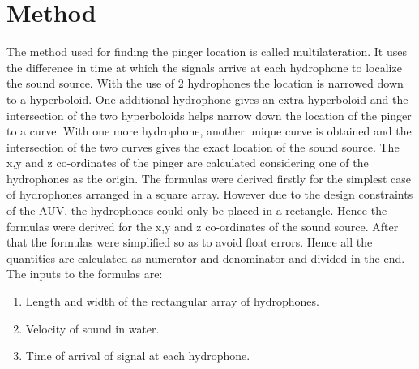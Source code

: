 \section{Method}\label{sec:method}
The method used for finding the pinger location is called multilateration. It uses the difference in time at which the signals arrive at each hydrophone to localize the sound source. With the use of 2 hydrophones the location is narrowed down to a hyperboloid. One additional hydrophone gives an extra hyperboloid and the intersection of the two hyperboloids helps narrow down the location of the pinger to a curve. With one more hydrophone, another unique curve is obtained and the intersection of the two curves gives the exact location of the sound source. The x,y and z co-ordinates of the pinger are calculated considering one of the hydrophones as the origin.\newline
The formulas were derived firstly for the simplest case of hydrophones arranged in a square array. However due to the design constraints of the AUV, the hydrophones could only be placed in a rectangle. Hence the formulas were derived for the x,y and z co-ordinates of the sound source. After that the formulas were simplified so as to avoid float errors. Hence all the quantities are calculated as numerator and denominator and divided in the end.\newline
The inputs to the formulas are:\begin{enumerate}
\item Length and width of the rectangular array of hydrophones.
\item Velocity of sound in water.
\item Time of arrival of signal at each hydrophone.
\end{enumerate}


